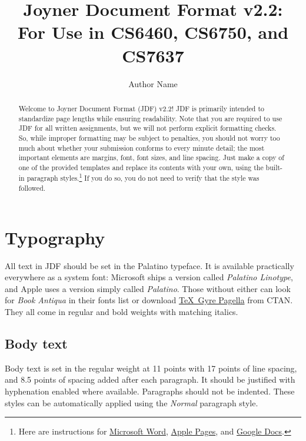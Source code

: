 \documentclass[
	letterpaper, %
]{jdf}
\author{Author Name}
\title{Joyner Document Format v2.2:\\For Use in CS6460, CS6750, and CS7637}
\begin{document}

\maketitle

\begin{abstract}
	Welcome to Joyner Document Format (JDF) v2.2! JDF is primarily intended to standardize page lengths while ensuring readability. Note that you are required to use JDF for all written assignments, but we will not perform explicit formatting checks. So, while improper formatting may be subject to penalties, you should not worry too much about whether your submission conforms to every minute detail; the most important elements are margins, font, font sizes, and line spacing. Just make a copy of one of the provided templates and replace its contents with your own, using the built-in paragraph styles.\footnote{Here are instructions for \href{https://support.office.com/en-us/article/Video-Using-Styles-in-Word-9db4c0f4-2754-4294-9758-c14a0abd8cfa}{Microsoft Word}, \href{https://support.apple.com/guide/pages/intro-to-paragraph-styles-tanaa39b0aa3/mac}{Apple Pages}, and \href{https://www.bazroberts.com/2016/04/19/google-docs-paragraph-styles-headings/}{Google Docs}.} If you do so, you do not need to verify that the style was followed.
\end{abstract}

\section{Typography}
All text in JDF should be set in the Palatino typeface. It is available practically everywhere as a system font: Microsoft ships a version called \emph{Palatino Linotype}, and Apple uses a version simply called \emph{Palatino}. Those without either can look for \emph{Book Antiqua} in their fonts list or download \href{https://www.ctan.org/tex-archive/fonts/tex-gyre/opentype}{\TeX\ Gyre Pagella} from CTAN. They all come in regular and bold weights with matching italics.

\subsection{Body text}
Body text is set in the regular weight at 11 points with 17 points of line spacing, and 8.5 points of spacing added after each paragraph. It should be justified with hyphenation enabled where available. Paragraphs should not be indented. These styles can be automatically applied using the \emph{Normal} paragraph style.
\end{document}
